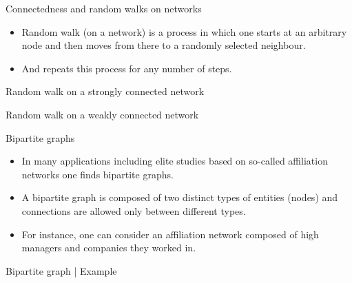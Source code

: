 \documentclass[
    hyperref={colorlinks,linkcolor=blue,urlcolor=blue,citecolor=blue}
]{beamer}
\begin{document}
\begin{frame}{Connectedness and random walks on networks}
\begin{itemize}
    \item<1-> Random walk (on a network) is a process in which one starts
    at an arbitrary node and then moves from there to a randomly selected
    neighbour.
    \item<2-> And repeats this process for any number of steps.
\end{itemize}
\end{frame}

\begin{frame}{Random walk on a strongly connected network}
\end{frame}

\begin{frame}{Random walk on a weakly connected network}
\end{frame}

\begin{frame}{Bipartite graphs}
\begin{itemize}
    \item<1-> In many applications including elite studies based on so-called
    affiliation networks one finds bipartite graphs.
    \item<2-> A bipartite graph is composed of two distinct types of entities
    (nodes) and connections are allowed only between different types.
    \item<3-> For instance, one can consider an affiliation network composed
    of high managers and companies they worked in.
\end{itemize}
\end{frame}

\begin{frame}{Bipartite graph | Example}
\begin{center}
\end{center}
\end{frame}
\end{document}
